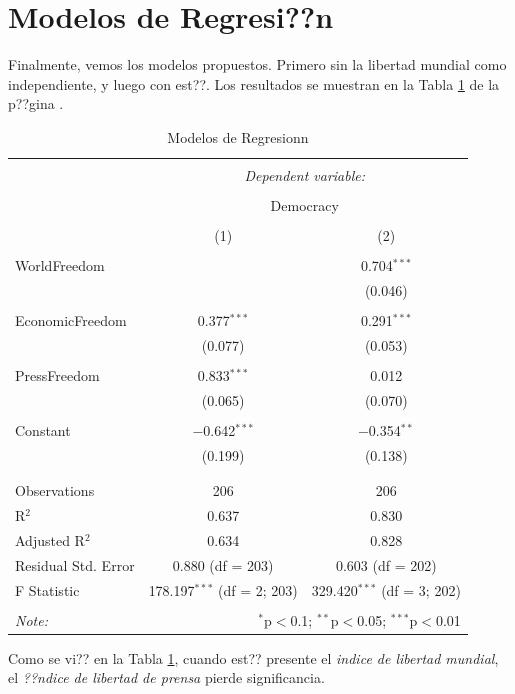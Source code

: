 \documentclass{article}
\begin{document}
\clearpage

\section{Modelos de Regresi??n}

Finalmente, vemos los modelos propuestos. Primero sin la libertad mundial como independiente, y luego con est??. Los resultados se muestran en la Tabla \ref{regresiones} de la p??gina \pageref{regresiones}.



\begin{table}[!htbp] \centering 
  \caption{Modelos de Regresionn} 
  \label{regresiones} 
\begin{tabular}{@{\extracolsep{5pt}}lcc} 
\\[-1.8ex]\hline 
\hline \\[-1.8ex] 
 & \multicolumn{2}{c}{\textit{Dependent variable:}} \\ 
\cline{2-3} 
\\[-1.8ex] & \multicolumn{2}{c}{Democracy} \\ 
\\[-1.8ex] & (1) & (2)\\ 
\hline \\[-1.8ex] 
 WorldFreedom &  & 0.704$^{***}$ \\ 
  &  & (0.046) \\ 
  & & \\ 
 EconomicFreedom & 0.377$^{***}$ & 0.291$^{***}$ \\ 
  & (0.077) & (0.053) \\ 
  & & \\ 
 PressFreedom & 0.833$^{***}$ & 0.012 \\ 
  & (0.065) & (0.070) \\ 
  & & \\ 
 Constant & $-$0.642$^{***}$ & $-$0.354$^{**}$ \\ 
  & (0.199) & (0.138) \\ 
  & & \\ 
\hline \\[-1.8ex] 
Observations & 206 & 206 \\ 
R$^{2}$ & 0.637 & 0.830 \\ 
Adjusted R$^{2}$ & 0.634 & 0.828 \\ 
Residual Std. Error & 0.880 (df = 203) & 0.603 (df = 202) \\ 
F Statistic & 178.197$^{***}$ (df = 2; 203) & 329.420$^{***}$ (df = 3; 202) \\ 
\hline 
\hline \\[-1.8ex] 
\textit{Note:}  & \multicolumn{2}{r}{$^{*}$p$<$0.1; $^{**}$p$<$0.05; $^{***}$p$<$0.01} \\ 
\end{tabular} 
\end{table} 
Como se vi?? en la Tabla \ref{regresiones}, cuando est?? presente el \emph{indice de libertad mundial}, el \emph{??ndice de libertad de prensa} pierde significancia.
\end{document}
